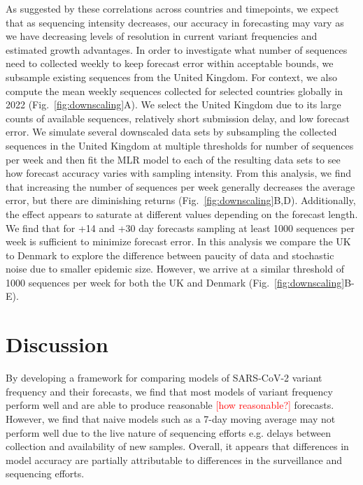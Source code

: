 \documentclass[11pt,oneside,letterpaper]{article}
\def\jhc#1{\textcolor{red}{[#1]}}
\begin{document}
As suggested by these correlations across countries and timepoints, we expect that as sequencing intensity decreases, our accuracy in forecasting may vary as we have decreasing levels of resolution in current variant frequencies and estimated growth advantages.
In order to investigate what number of sequences need to collected weekly to keep forecast error within acceptable bounds, we subsample existing sequences from the United Kingdom.
For context, we also compute the mean weekly sequences collected for selected countries globally in 2022 (Fig.~\ref{fig:downscaling}A).
We select the United Kingdom due to its large counts of available sequences, relatively short submission delay, and low forecast error.
We simulate several downscaled data sets by subsampling the collected sequences in the United Kingdom at multiple thresholds for number of sequences per week and then fit the MLR model to each of the resulting data sets to see how forecast accuracy varies with sampling intensity.
From this analysis, we find that increasing the number of sequences per week generally decreases the average error, but there are diminishing returns (Fig.~\ref{fig:downscaling}B,D).
Additionally, the effect appears to saturate at different values depending on the forecast length.
We find that for +14 and +30 day forecasts sampling at least 1000 sequences per week is sufficient to minimize forecast error.
In this analysis we compare the UK to Denmark to explore the difference between paucity of data and stochastic noise due to smaller epidemic size.
However, we arrive at a similar threshold of 1000 sequences per week for both the UK and Denmark  (Fig.~\ref{fig:downscaling}B-E).

\section*{Discussion}




By developing a framework for comparing models of SARS-CoV-2 variant frequency and their forecasts, we find that most models of variant frequency perform well and are able to produce reasonable \jhc{how reasonable?} forecasts.
However, we find that naive models such as a 7-day moving average may not perform well due to the live nature of sequencing efforts e.g. delays between collection and availability of new samples.
Overall, it appears that differences in model accuracy are partially attributable to differences in the surveillance and sequencing efforts.
\end{document}
